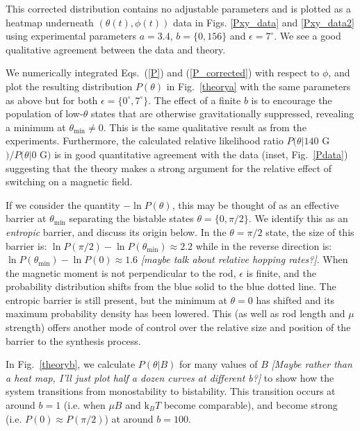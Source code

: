 \documentclass[aps,prl,twocolumn,superscriptaddress]{revtex4-1}
\newcommand{\kk}{\mathrm{k}_B}
\begin{document}
This corrected distribution contains no adjustable parameters and is plotted as a heatmap underneath $(\theta(t),\phi(t))$ data in Figs. \ref{Pxy_data} and \ref{Pxy_data2} using experimental parameters $a=3.4$, $b=\{0,156\}$ and $\epsilon=7^\circ$. We see a good qualitative agreement between the data and theory.

We numerically integrated Eqs.\ (\ref{P}) and (\ref{P_corrected}) with respect to $\phi$, and plot the resulting distribution $P(\theta)$ in Fig.\ \ref{theorya} with the same parameters as above but for both $\epsilon=\{0^\circ,7^\circ\}$. The effect of a finite $b$ is to encourage the population of low-$\theta$ states that are otherwise gravitationally suppressed, revealing a minimum at $\theta_{\text{min}}\ne 0$. This is the same qualitative result as from the experiments. Furthermore, the calculated relative likelihood ratio $P(\theta|140$ G$)/P(\theta|0$ G$)$ is in good quantitative agreement with the data (inset, Fig.\ \ref{Pdata}) suggesting that the theory makes a strong argument for the relative effect of switching on a magnetic field. 

If we consider the quantity $-\ln{P(\theta)}$, this may be thought of as an effective barrier at $\theta_{\text{min}}$ separating the bistable states $\theta=\{0,\pi/2\}$. We identify this as an \emph{entropic} barrier, and discuss its origin below. In the $\theta=\pi/2$ state, the size of this barrier is: $\ln{P(\pi/2)}-\ln{P(\theta_{\text{min}})}\approx 2.2$ while in the reverse direction is: $\ln{P(\theta_{\text{min}})}-\ln{P(0)}\approx 1.6$ \emph{[maybe talk about relative hopping rates?]}. When the magnetic moment is not perpendicular to the rod, $\epsilon$ is finite, and the probability distribution shifts from the blue solid to the blue dotted line. The entropic barrier is still present, but the minimum at $\theta=0$ has shifted and its maximum probability density has been lowered. This (as well as rod length and $\mu$ strength) offers another mode of control over the relative size and position of the barrier to the synthesis process. 

In Fig.\ \ref{theoryb}, we calculate $P(\theta| B)$ for many values of $B$ \emph{[Maybe rather than a heat map, I'll just plot half a dozen curves at different b?]} to show how the system transitions from monostability to bistability. This transition occurs at around $b = 1$ (i.e. when $\mu B$ and $\kk T$ become comparable), and become strong (i.e. $P(0)\approx P(\pi/2)$) at around $b=100$.
\end{document}
